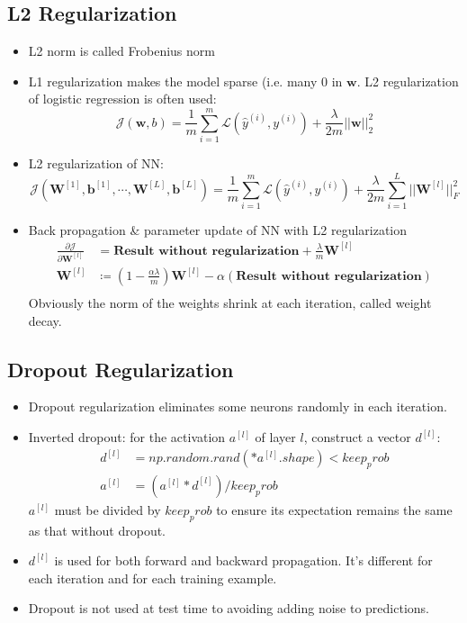 \subsection{L2 Regularization}
\begin{itemize}
  \item L2 norm is called Frobenius norm
  \item L1 regularization makes the model sparse (i.e. many 0 in $\mathbf{w}$. L2 regularization of logistic regression is often used:
  \[\mathcal{J}(\mathbf{w},b)=\frac{1}{m}\displaystyle\sum_{i=1}^m\mathcal{L}(\hat{y}^{(i)}, y^{(i)})+\frac{\lambda}{2m}\vert\vert\mathbf{w}\vert\vert^2_2\] 
  \item L2 regularization of NN: 
  \[\mathcal{J}(\mathbf{W}^{[1]},\mathbf{b}^{[1]},\cdots,\mathbf{W}^{[L]},\mathbf{b}^{[L]})=\frac{1}{m}\displaystyle\sum_{i=1}^m\mathcal{L}(\hat{y}^{(i)}, y^{(i)})+\frac{\lambda}{2m}\displaystyle\sum_{i=1}^L\vert\vert\mathbf{W}^{[l]}\vert\vert^2_F\] 
  \item Back propagation \& parameter update of NN with L2 regularization
  \begin{align*}
  \frac{\partial \mathcal{J}}{\partial \mathbf{W}^{[l]}}&=\textbf{Result without regularization}+\frac{\lambda}{m}\mathbf{W}^{[l]}\\
  \mathbf{W}^{[l]}&\coloneqq\left(1-\frac{\alpha\lambda}{m}\right)\mathbf{W}^{[l]}-\alpha(\textbf{Result without regularization})\\
  \end{align*}
  Obviously the norm of the weights shrink at each iteration, called weight decay. 
\end{itemize}
\subsection{Dropout Regularization}
\begin{itemize}
  \item Dropout regularization eliminates some neurons randomly in each iteration.
  \item Inverted dropout: for the activation $a^{[l]}$ of layer $l$, construct a vector $d^{[l]}$:
  \begin{align*}
    d^{[l]}&=np.random.rand(*a^{[l]}.shape) < keep_prob\\
    a^{[l]}&=(a^{[l]} * d^{[l]}) / keep_prob
  \end{align*}
  $a^{[l]}$ must be divided by $keep_prob$ to ensure its expectation remains the same as that without dropout.
  \item $d^{[l]}$ is used for both forward and backward propagation. It's different for each iteration and for each training example.
  \item Dropout is not used at test time to avoiding adding noise to predictions. 
\end{itemize}
